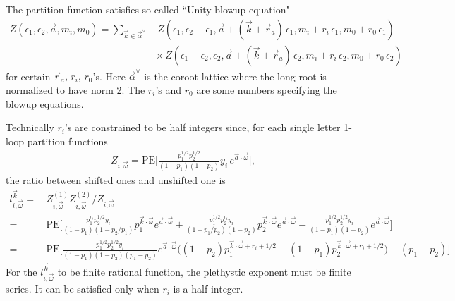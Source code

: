 \documentclass[letterpaper, 11pt]{article}
\begin{document}
The partition function satisfies so-called ``Unity blowup equation" 
\begin{align}
Z(\epsilon_1,\epsilon_2,\vec{a},m_i, m_0)=\sum_{\vec{k}\in\vec{\alpha}^{\lor}}&\,Z(\epsilon_1,\epsilon_2-\epsilon_1,\vec{a}+(\vec{k}+\vec{r}_a)\,\epsilon_1,m_i+r_i\,\epsilon_1,m_0+r_0\,\epsilon_1)\nonumber\\
&\times\, Z(\epsilon_1-\epsilon_2,\epsilon_2,\vec{a}+(\vec{k}+\vec{r}_a)\,\epsilon_2,m_i+r_i\,\epsilon_2,m_0+r_0\,\epsilon_2)
\end{align}
for certain $\vec{r}_a,\, r_i,\,r_0$'s.
Here $\vec{\alpha}^{\lor}$ is the coroot lattice where the long root is normalized to have norm 2. The $r_i$'s and $r_0$ are some numbers specifying the blowup equations.

Technically $r_i$'s are constrained to be half integers since, for each single letter 1-loop partition functions
\begin{align}
Z_{i,\vec{\omega}}=\textrm{PE}\Bigg[\frac{p_1^{1/2}p_2^{1/2}}{(1-p_1)(1-p_2)}y_i\,e^{\vec{a}\cdot\vec{\omega}}\Bigg],
\end{align}
the ratio between shifted ones and unshifted one is
\begin{align}
l^{\vec{k}}_{i,\vec{\omega}}=&\,Z^{(1)}_{i,\vec{\omega}}Z^{(2)}_{i,\vec{\omega}}/Z_{i,\vec{\omega}}\nonumber\\
=&\,\textrm{PE}\Bigg[\frac{p_1^{r_i}p_2^{1/2}y_i}{(1-p_1)(1-p_2/p_1)}p_1^{\vec{k}\cdot\vec{\omega}}e^{\vec{a}\cdot\vec{\omega}}+\frac{p_1^{1/2}p_2^{r_i}y_i}{(1-p_1/p_2)(1-p_2)}p_2^{\vec{k}\cdot\vec{\omega}}e^{\vec{a}\cdot\vec{\omega}}-\frac{p_1^{1/2}p_2^{1/2}y_i}{(1-p_1)(1-p_2)}e^{\vec{a}\cdot\vec{\omega}}\Bigg]\nonumber\\
=&\,\textrm{PE}\Bigg[\frac{p_1^{1/2}p_2^{1/2}y_i}{(1-p_1)(1-p_2)(p_1-p_2)}e^{\vec{a}\cdot\vec{\omega}}\Big((1-p_2)p_1^{\vec{k}\cdot\vec{\omega}+r_i+1/2}-(1-p_1)p_2^{\vec{k}\cdot\vec{\omega}+r_i+1/2}\Big)-(p_1-p_2)\Bigg]
\end{align}
For the $l^{\vec{k}}_{i,\vec{\omega}}$ to be finite rational function, the plethystic exponent must be finite series. It can be satisfied only when $r_i$ is a half integer.
\end{document}
